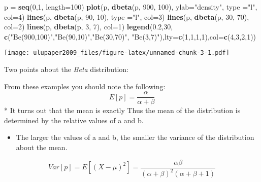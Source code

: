 \documentclass[
]{book}
\newenvironment{Shaded}{\begin{snugshade}}{\end{snugshade}}
\newcommand{\DataTypeTok}[1]{\textcolor[rgb]{0.13,0.29,0.53}{#1}}
\newcommand{\DecValTok}[1]{\textcolor[rgb]{0.00,0.00,0.81}{#1}}
\newcommand{\FloatTok}[1]{\textcolor[rgb]{0.00,0.00,0.81}{#1}}
\newcommand{\KeywordTok}[1]{\textcolor[rgb]{0.13,0.29,0.53}{\textbf{#1}}}
\newcommand{\NormalTok}[1]{#1}
\newcommand{\StringTok}[1]{\textcolor[rgb]{0.31,0.60,0.02}{#1}}
\providecommand{\tightlist}{%
  \setlength{\itemsep}{0pt}\setlength{\parskip}{0pt}}
\begin{document}
\begin{Shaded}
\begin{Highlighting}[]
\NormalTok{p =}\StringTok{ }\KeywordTok{seq}\NormalTok{(}\DecValTok{0}\NormalTok{,}\DecValTok{1}\NormalTok{, }\DataTypeTok{length=}\DecValTok{100}\NormalTok{)}
\KeywordTok{plot}\NormalTok{(p, }\KeywordTok{dbeta}\NormalTok{(p, }\DecValTok{900}\NormalTok{, }\DecValTok{100}\NormalTok{), }\DataTypeTok{ylab=}\StringTok{"density"}\NormalTok{, }\DataTypeTok{type =}\StringTok{"l"}\NormalTok{, }\DataTypeTok{col=}\DecValTok{4}\NormalTok{)}
\KeywordTok{lines}\NormalTok{(p, }\KeywordTok{dbeta}\NormalTok{(p, }\DecValTok{90}\NormalTok{, }\DecValTok{10}\NormalTok{), }\DataTypeTok{type =}\StringTok{"l"}\NormalTok{, }\DataTypeTok{col=}\DecValTok{3}\NormalTok{)}
\KeywordTok{lines}\NormalTok{(p, }\KeywordTok{dbeta}\NormalTok{(p, }\DecValTok{30}\NormalTok{, }\DecValTok{70}\NormalTok{), }\DataTypeTok{col=}\DecValTok{2}\NormalTok{) }
\KeywordTok{lines}\NormalTok{(p, }\KeywordTok{dbeta}\NormalTok{(p, }\DecValTok{3}\NormalTok{, }\DecValTok{7}\NormalTok{), }\DataTypeTok{col=}\DecValTok{1}\NormalTok{) }
\KeywordTok{legend}\NormalTok{(}\FloatTok{0.2}\NormalTok{,}\DecValTok{30}\NormalTok{, }\KeywordTok{c}\NormalTok{(}\StringTok{"Be(900,100)"}\NormalTok{,}\StringTok{"Be(90,10)"}\NormalTok{,}\StringTok{"Be(30,70)"}\NormalTok{, }\StringTok{"Be(3,7)"}\NormalTok{),}\DataTypeTok{lty=}\KeywordTok{c}\NormalTok{(}\DecValTok{1}\NormalTok{,}\DecValTok{1}\NormalTok{,}\DecValTok{1}\NormalTok{,}\DecValTok{1}\NormalTok{),}\DataTypeTok{col=}\KeywordTok{c}\NormalTok{(}\DecValTok{4}\NormalTok{,}\DecValTok{3}\NormalTok{,}\DecValTok{2}\NormalTok{,}\DecValTok{1}\NormalTok{))}
\end{Highlighting}
\end{Shaded}

\texttt{[image: ulupaper2009\_files/figure-latex/unnamed-chunk-3-1.pdf]}

Two points about the \emph{Beta} distribution:

From these examples you should note the following:
\[E[p]=\frac{\alpha}{\alpha+\beta}\]
* It turns out that the mean is exactly Thus the mean of the distribution is determined by the relative values of a and b.

\begin{itemize}
\tightlist
\item
  The larger the values of a and b, the smaller the variance of the distribution about the mean.
\end{itemize}

\[Var[p]=E[(X-\mu)^2]=\frac{\alpha\beta}{(\alpha+\beta)^2(\alpha+\beta+1)}\]
\end{document}
